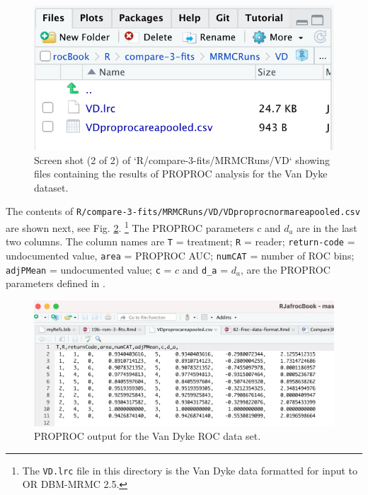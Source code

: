 \documentclass[
]{book}
\begin{document}
\begin{figure}

{\centering \includegraphics{images/compare-3-fits/MRMCRuns-VD} 

}

\caption{Screen shot (2 of 2) of `R/compare-3-fits/MRMCRuns/VD` showing files containing the results of PROPROC analysis for the Van Dyke dataset.}\label{fig:rsm-3-fits-mrmc-runs-vd}
\end{figure}

The contents of \texttt{R/compare-3-fits/MRMCRuns/VD/VDproprocnormareapooled.csv} are shown next, see Fig. \ref{fig:rsm-3-fits-proproc-output-van-dyke}. \footnote{The \texttt{VD.lrc} file in this directory is the Van Dyke data formatted for input to OR DBM-MRMC 2.5.} The PROPROC parameters \(c\) and \(d_a\) are in the last two columns. The column names are \texttt{T} = treatment; \texttt{R} = reader; \texttt{return-code} = undocumented value, \texttt{area} = PROPROC AUC; \texttt{numCAT} = number of ROC bins; \texttt{adjPMean} = undocumented value; \texttt{c} = \(c\) and \texttt{d\_a} = \(d_a\), are the PROPROC parameters defined in \citep{metz1999proper}.

\begin{figure}

{\centering \includegraphics[width=0.5\linewidth,height=0.2\textheight]{images/compare-3-fits/vanDyke} 

}

\caption{PROPROC output for the Van Dyke ROC data set.}\label{fig:rsm-3-fits-proproc-output-van-dyke}
\end{figure}
\end{document}
